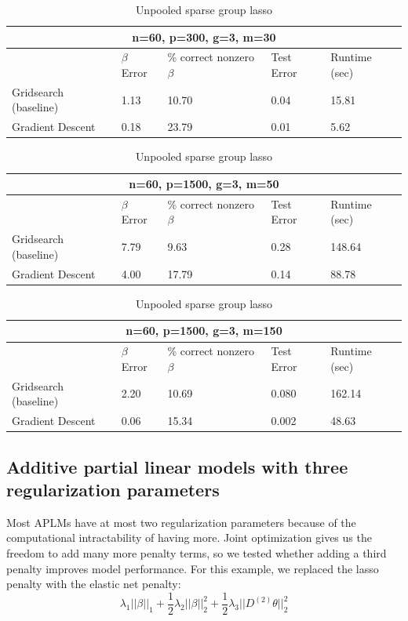 \documentclass[10pt,letterpaper]{article}
\begin{document}
\begin{table}
\begin{center}
\begin{tabular}{| l | l | l | l | l | }
\hline
\multicolumn{5}{|c|}{n=60, p=300, g=3, m=30}\\
\hline
 & $\beta$ Error & \% correct nonzero $\beta$ & Test Error & Runtime (sec) \\
\hline
Gridsearch (baseline) & 1.13 & 10.70 & 0.04 & 15.81 \\
\hline
Gradient Descent & 0.18 & 23.79 & 0.01 & 5.62 \\
\hline
\end{tabular}

\begin{tabular}{| l | l | l | l | l | }
\hline
\multicolumn{5}{|c|}{n=60, p=1500, g=3, m=50}\\
\hline
 & $\beta$ Error & \% correct nonzero $\beta$ & Test Error & Runtime (sec) \\
\hline
Gridsearch (baseline) & 7.79 & 9.63 & 0.28 & 148.64 \\
\hline
Gradient Descent & 4.00 & 17.79 & 0.14 & 88.78 \\
\hline
\end{tabular}

\begin{tabular}{| l | l | l | l | l | }
\hline
\multicolumn{5}{|c|}{n=60, p=1500, g=3, m=150}\\
\hline
 & $\beta$ Error & \% correct nonzero $\beta$ & Test Error & Runtime (sec) \\
\hline
Gridsearch (baseline) & 2.20 & 10.69 & 0.080 & 162.14 \\
\hline
Gradient Descent & 0.06 & 15.34 & 0.002 & 48.63 \\
\hline
\end{tabular}
\end{center}
\caption {Unpooled sparse group lasso}
\label{table:unpooled}
\end{table}

\subsection{Additive partial linear models with three regularization parameters}
Most APLMs have at most two regularization parameters because of the computational intractability of having more. Joint optimization gives us the freedom to add many more penalty terms, so we tested whether adding a third penalty improves model performance. For this example, we replaced the lasso penalty with the elastic net penalty:
\begin{equation}
\lambda_1 \lvert\lvert \beta \rvert \rvert_1
+ \frac{1}{2} \lambda_2 \lvert\lvert \beta \rvert \rvert_2^2
+ \frac{1}{2} \lambda_3 \lvert\lvert D^{(2)} \theta \rvert \rvert_2^2
\end{equation}
\end{document}
